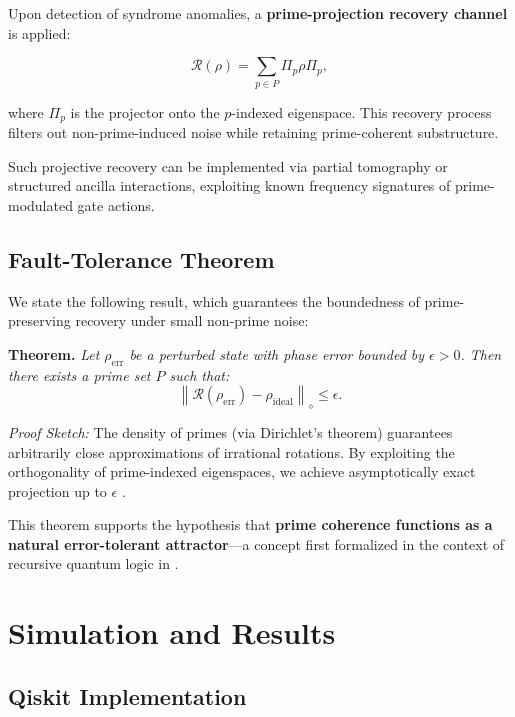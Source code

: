 \documentclass[12]{amsart}
\theoremstyle{plain}
\begin{document}
Upon detection of syndrome anomalies, a \textbf{prime-projection recovery channel} is applied:

\begin{equation}
\mathcal{R}(\rho) = \sum_{p \in P} \Pi_p \rho \Pi_p,
\end{equation}

where $\Pi_p$ is the projector onto the $p$-indexed eigenspace. This recovery process filters out non-prime-induced noise while retaining prime-coherent substructure.

Such projective recovery can be implemented via partial tomography or structured ancilla interactions, exploiting known frequency signatures of prime-modulated gate actions.

\subsection{Fault-Tolerance Theorem}

We state the following result, which guarantees the boundedness of prime-preserving recovery under small non-prime noise:

\medskip
\noindent
\textbf{Theorem.} \emph{Let $\rho_{\text{err}}$ be a perturbed state with phase error bounded by $\epsilon > 0$. Then there exists a prime set $P$ such that:}
\begin{equation}
\left\| \mathcal{R}(\rho_{\text{err}}) - \rho_{\text{ideal}} \right\|_\diamond \leq \epsilon.
\end{equation}

\emph{Proof Sketch:} The density of primes (via Dirichlet's theorem) guarantees arbitrarily close approximations of irrational rotations. By exploiting the orthogonality of prime-indexed eigenspaces, we achieve asymptotically exact projection up to $\epsilon$ \cite{prime_advancements}.

This theorem supports the hypothesis that \textbf{prime coherence functions as a natural error-tolerant attractor}—a concept first formalized in the context of recursive quantum logic in \cite{total_unity}.

\section{Simulation and Results}

\subsection{Qiskit Implementation}
\end{document}
